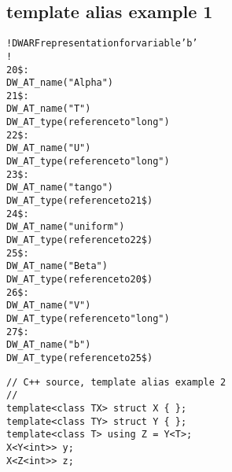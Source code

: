 \subsection{template alias example 1}
\label{app:templatealiasexample1}
\begin{alltt}
! DWARF representation for variable 'b'
!
20\$: 
        DW\-\_AT\-\_name("Alpha")
21\$:   
            DW\-\_AT\-\_name("T")
            DW\-\_AT\-\_type(reference to "long")
22\$:   
            DW\-\_AT\-\_name("U")
            DW\-\_AT\-\_type(reference to "long")
23\$:   
            DW\-\_AT\-\_name("tango")
            DW\-\_AT\-\_type(reference to 21\$)
24\$:   
            DW\-\_AT\-\_name("uniform")
            DW\-\_AT\-\_type(reference to 22\$)
25\$: 
        DW\-\_AT\-\_name("Beta")
        DW\-\_AT\-\_type(reference to 20\$)
26\$:   
            DW\-\_AT\-\_name("V")
            DW\-\_AT\-\_type(reference to "long")
27\$: 
        DW\-\_AT\-\_name("b")
        DW\-\_AT\-\_type(reference to 25\$)
\end{alltt}


\begin{lstlisting}
// C++ source, template alias example 2
//
template<class TX> struct X { };
template<class TY> struct Y { };
template<class T> using Z = Y<T>;
X<Y<int>> y;
X<Z<int>> z;
\end{lstlisting}


